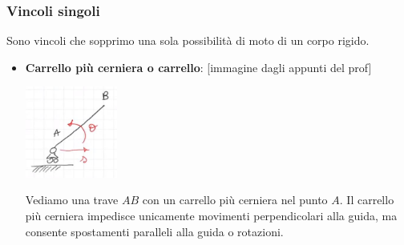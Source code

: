 \subsubsection{Vincoli singoli}
Sono vincoli che sopprimo una sola possibilità di moto di un corpo rigido.
\begin{itemize}
    \item \textbf{Carrello più cerniera o carrello}: [immagine dagli appunti del prof]
    \begin{center}
        \includegraphics[height=3cm]{../lezione3/img9.JPG}
    \end{center}
    Vediamo una trave $AB$ con un carrello più cerniera nel punto $A$. Il carrello più cerniera impedisce unicamente movimenti perpendicolari alla guida, ma consente spostamenti paralleli alla guida o rotazioni.
\end{itemize}